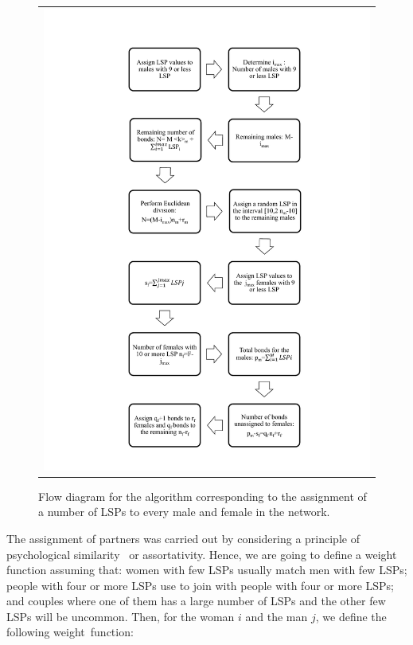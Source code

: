 \begin{figure}[H]
	\centering
	\begin{tabular}{c}
		\includegraphics[width=\textwidth]{IMG/FluxDiagramI.pdf}
	\end{tabular}
	\caption{Flow diagram for the algorithm corresponding to the assignment of a number of LSPs to every male and female in the network.\label{flux1}}
\end{figure}

The assignment of partners was carried out by considering a principle of psychological similarity~\cite{gentner1997structure} or assortativity.
Hence, we are going to define a weight function assuming that: women with few LSPs usually match men with few LSPs; people with four or more LSPs use to join with people with four or more LSPs; and couples where one of them has a large number of LSPs and the other few LSPs will be uncommon. Then, for the woman $i$ and the man $j$, we define the following weight~function:

